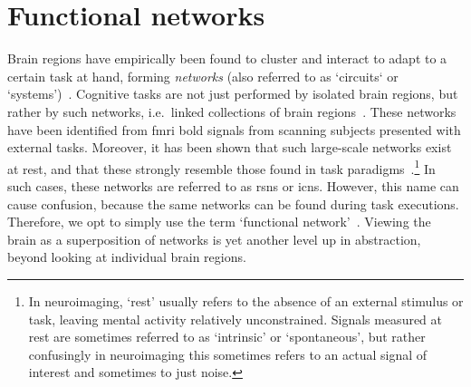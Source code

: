 \clearpage
\section{Functional networks}
\label{sec:functional-brain-networks}

Brain regions have empirically been found to cluster and interact to adapt to a certain task at hand, forming \emph{networks} (also referred to as `circuits` or `systems')~\parencite{Fox2007}.
Cognitive tasks are not just performed by isolated brain regions, but rather by such networks, i.e.~linked collections of brain regions~\parencite{Bressler2010}.
%
These networks have been identified from \gls{fmri} \gls{bold} signals from scanning subjects presented with external tasks.
Moreover, it has been shown that such large-scale networks exist at rest, and that these strongly resemble those found in task paradigms~\parencite{Smith2009}.\footnote{In neuroimaging, `rest' usually refers to the absence of an external stimulus or task, leaving mental activity relatively unconstrained. Signals measured at rest are sometimes referred to as `intrinsic' or `spontaneous', but rather confusingly in neuroimaging this sometimes refers to an actual signal of interest and sometimes to just noise.}
In such cases, these networks are referred to as \glspl{rsn} or \glspl{icn}.
However, this name can cause confusion, because the same networks can be found during task executions.
Therefore, we opt to simply use the term `functional network'~\parencite[FN; see also][]{Finn2021}.
Viewing the brain as a superposition of networks is yet another level up in abstraction, beyond looking at individual brain regions.

